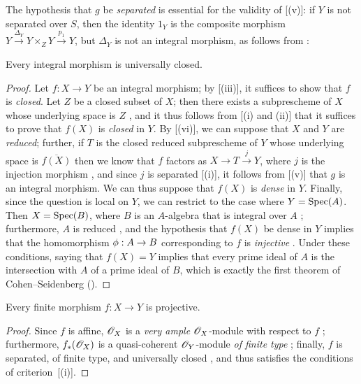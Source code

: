 \begin{remark}[6.1.9]
\label{II.6.1.9}
The hypothesis that $g$ be \emph{separated} is essential for the validity of [(v)]: if $Y$ is not separated over $S$, then the identity $1_Y$ is the composite morphism $Y\xrightarrow{\Delta_Y}Y\times_Z Y\xrightarrow{p_1}Y$, but $\Delta_Y$ is not an integral morphism, as follows from :
\end{remark}

\begin{proposition}[6.1.10]
\label{II.6.1.10}
Every integral morphism is universally closed.
\end{proposition}

\begin{proof}
Let $f:X\to Y$ be an integral morphism;
by [(iii)], it suffices to show that $f$ is \emph{closed}.
Let $Z$ be a closed subset of $X$;
then there exists a subprescheme of $X$ whose underlying space is $Z$ , and it thus follows from [(i) and (ii)] that it suffices to prove that $f(X)$ is \emph{closed} in $Y$.
By [(vi)], we can suppose that $X$ and $Y$ are \emph{reduced};
further, if $T$ is the closed reduced subprescheme of $Y$ whose underlying space is $\overline{f(X)}$  then we know that $f$ factors as $X\to T\xrightarrow{j}Y$, where $j$ is the injection morphism , and since $j$ is separated [(i)], it follows from [(v)] that $g$ is an integral morphism.
We can thus suppose that $f(X)$ is \emph{dense} in $Y$.
Finally, since the question is local on $Y$, we can restrict to the case where $Y=\operatorname{Spec}(A)$.
Then $X=\operatorname{Spec}(B)$, where $B$ is an $A$-algebra that is integral over $A$ ;
furthermore, $A$ is reduced , and the hypothesis that $f(X)$ be dense in $Y$ implies that the homomorphism $\vphi:A\to B$ corresponding to $f$ is \emph{injective} .
Under these conditions, saying that $f(X)=Y$ implies that every prime ideal of $A$ is the intersection with $A$ of a prime ideal of $B$, which is exactly the first theorem of Cohen--Seidenberg (\cite[t.~I, p.~257, th.~3]{II-13}).
\end{proof}

\begin{corollary}[6.1.11]
\label{II.6.1.11}
Every finite morphism $f:X\to Y$ is projective.
\end{corollary}

\begin{proof}
Since $f$ is affine, $\mathscr{O}_X$ is a \emph{very ample} $\mathscr{O}_X$-module with respect to $f$ ;
furthermore, $f_*(\mathscr{O}_X)$ is a quasi-coherent $\mathscr{O}_Y$-module \emph{of finite type} ;
finally, $f$ is separated, of finite type, and universally closed , and thus satisfies the conditions of criterion~[(i)].
\end{proof}

